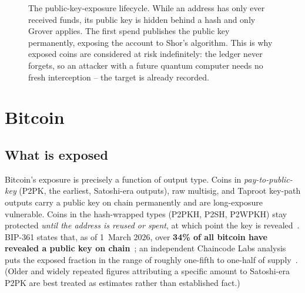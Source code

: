 \begin{figure}[H]
\centering
{}
\caption{The public-key-exposure lifecycle. While an address has only ever received funds, its public key is hidden behind a hash and only Grover applies. The first spend publishes the public key permanently, exposing the account to Shor's algorithm. This is why exposed coins are considered at risk indefinitely: the ledger never forgets, so an attacker with a future quantum computer needs no fresh interception -- the target is already recorded.}
\label{fig:pubkey-exposure}
\end{figure}

\section{Bitcoin}
\subsection{What is exposed}
Bitcoin's exposure is precisely a function of output type. Coins in \emph{pay-to-public-key} (P2PK, the earliest, Satoshi-era outputs), raw multisig, and Taproot key-path outputs carry a public key on chain permanently and are long-exposure vulnerable. Coins in the hash-wrapped types (P2PKH, P2SH, P2WPKH) stay protected \emph{until the address is reused or spent}, at which point the key is revealed~\cite{bip360,chaincodepq2025}. BIP-361 states that, as of 1~March 2026, over \textbf{34\% of all bitcoin have revealed a public key on chain}~\cite{bip361}; an independent Chaincode Labs analysis puts the exposed fraction in the range of roughly one-fifth to one-half of supply~\cite{chaincodepq2025}. (Older and widely repeated figures attributing a specific amount to Satoshi-era P2PK are best treated as estimates rather than established fact.)

